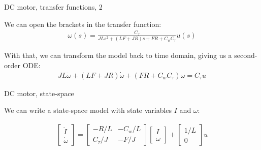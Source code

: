 \documentclass{beamer}
\begin{document}
\begin{frame}{DC motor, transfer functions, 2}
	\begin{flushleft}
		
		We can open the brackets in the transfer function:
		\begin{align}
			\omega(s)  = \frac{C_\tau}{JL s^2 + (LF+JR)s + FR+C_w C_\tau} u(s)
		\end{align}
	
		\bigskip
		
		With that, we can transform the model back to time domain, giving us a second-order ODE:
		\begin{align}
			JL \ddot \omega  + (LF+JR) \dot \omega  + (FR+C_w C_\tau) \omega =
			C_\tau u 
		\end{align}
		
	\end{flushleft}
\end{frame}



\begin{frame}{DC motor, state-space}
	\begin{flushleft}
		
		We can write a state-space model with state variables $I$ and $\omega$:
		
		\begin{align}
			\begin{bmatrix}
				\dot I \\ \dot\omega
			\end{bmatrix}
		=
			\begin{bmatrix}
				-R/L & -C_w/L \\
				C_\tau/J & -F/J
			\end{bmatrix}
			\begin{bmatrix}
				I \\ \omega
			\end{bmatrix}
			+
			\begin{bmatrix}
				1/L \\ 0
			\end{bmatrix}
				u
		\end{align}
		
	\end{flushleft}
\end{frame}
\end{document}
